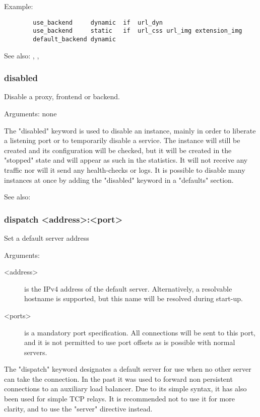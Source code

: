   Example:
  \begin{verbatim}
        use_backend     dynamic  if  url_dyn
        use_backend     static   if  url_css url_img extension_img
        default_backend dynamic
  \end{verbatim}

  See also: , , 

\subsubsection[disabled]{disabled}
  Disable a proxy, frontend or backend.
  

  Arguments: none

  The "disabled" keyword is used to disable an instance, mainly in order to
  liberate a listening port or to temporarily disable a service. The instance
  will still be created and its configuration will be checked, but it will be
  created in the "stopped" state and will appear as such in the statistics. It
  will not receive any traffic nor will it send any health-checks or logs. It
  is possible to disable many instances at once by adding the "disabled"
  keyword in a "defaults" section.

  See also: 

\subsubsection[dispatch]{dispatch <address>:<port>}
  Set a default server address
  
  
  Arguments:
  \begin{description}
  \item[<address>] is the IPv4 address of the default server. Alternatively, a
              resolvable hostname is supported, but this name will be resolved
              during start-up.

  \item[<ports>]   is a mandatory port specification. All connections will be sent
              to this port, and it is not permitted to use port offsets as is
              possible with normal servers.
  \end{description}

  The "dispatch" keyword designates a default server for use when no other
  server can take the connection. In the past it was used to forward non
  persistent connections to an auxiliary load balancer. Due to its simple
  syntax, it has also been used for simple TCP relays. It is recommended not to
  use it for more clarity, and to use the "server" directive instead.

